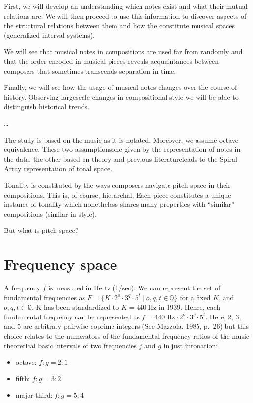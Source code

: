 \documentclass[letterpaper,10pt,english]{sphinxmanual}
\begin{document}
\sphinxAtStartPar
First, we will develop an understanding which notes exist and what their
mutual relations are. We will then proceed to use this information to
discover aspects of the structural relations between them and how the
constitute musical spaces (generalized interval systems).

\sphinxAtStartPar
We will see that musical notes in compositions are used far from
randomly and that the order encoded in musical pieces reveals
acquaintances between composers that sometimes transcends separation in
time.

\sphinxAtStartPar
Finally, we will see how the usage of musical notes changes over the
course of history. Observing large\sphinxhyphen{}scale changes in compositional style
we will be able to distinguish historical trends.

\sphinxAtStartPar
…

\sphinxAtStartPar
The study is based on the music as it is notated. Moreover, we assume
octave equivalence. These two assumptions\textendash{}one given by the
representation of notes in the data, the other based on theory and
previous literature\textendash{}leads to the Spiral Array representation of tonal
space.

\sphinxAtStartPar
Tonality is constituted by the ways composers navigate pitch space in
their compositions. This is, of course, hierarchal. Each piece
constitutes a unique instance of tonality which nonetheless shares many
properties with “similar” compositions (similar in style).

\sphinxAtStartPar
But what is pitch space?


\section{Frequency space}
\label{\detokenize{5_notes:frequency-space}}
\sphinxAtStartPar
A frequency \(f\) is measured in Hertz (1/sec). We can represent the
set of fundamental frequencies as
\(F=\{ K \cdot 2^o \cdot 3^q \cdot 5^t\mid o, q, t \in \mathbb Q \}\)
for a fixed  \(K\), and \(o, q, t\in \mathbb Q\). K
has been standardized to \(K=440~\text{Hz}\) in 1939. Hence, each
fundamental frequency can be represented as
\(f=440 \text{ Hz} \cdot 2^o \cdot 3^q \cdot 5^t\). Here, 2, 3, and
5 are arbitrary pairwise coprime integers (See Mazzola, 1985, p. 26) but
this choice relates to the numerators of the fundamental frequency
ratios of the music theoretical basic intervals of two frequencies
\(f\) and \(g\) in just intonation:
\begin{itemize}
\item {} 
\sphinxAtStartPar
octave: \(f:g = 2:1\)

\item {} 
\sphinxAtStartPar
fifth: \(f:g=3:2\)

\item {} 
\sphinxAtStartPar
major third: \(f:g = 5:4\)

\end{itemize}
\end{document}

